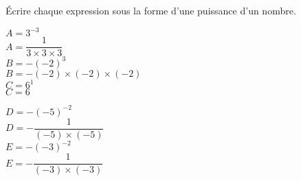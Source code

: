     Écrire chaque expression sous la forme d'une puissance d'un nombre.
    \begin{spacing}{1.5}
    \begin{minipage}{0.55\linewidth}
        $A=3^{-3}$\\
        {\red $A=\dfrac{1}{3\times3\times3}$}\\
        $B=-(-2)^{3}$\\
        {\red $B=-(-2)\times(-2)\times(-2)$}\\
        $C=6^{1}$\\
        {\red $C=6$}\\
    \end{minipage}
    \begin{minipage}{0.35\linewidth}
        $D=-(-5)^{-2}$\\
        {\red $D=-\dfrac{1}{(-5)\times(-5)}$}\\
        $E=-(-3)^{-2}$\\
        {\red $E= -\dfrac{1}{(-3)\times(-3)}$}
    \end{minipage}
    \end{spacing}
